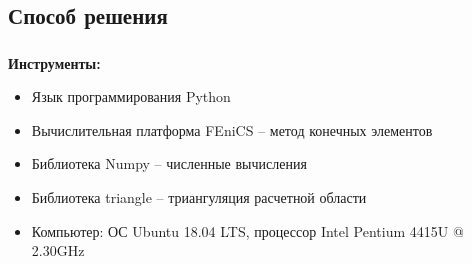 
\subsection{Способ решения}

\begin{frame}
\frametitle{\insertsection}
\framesubtitle{\insertsubsection}

\textbf{Инструменты:}
\begin{itemize}
    \item Язык программирования Python
    \item Вычислительная платформа FEniCS -- метод конечных элементов
    \item Библиотека Numpy -- численные вычисления
    \item Библиотека triangle -- триангуляция расчетной области
    \item Компьютер: ОС Ubuntu 18.04 LTS, процессор Intel Pentium 4415U @ 2.30GHz
\end{itemize}
\end{frame}

% 
% 
% 


